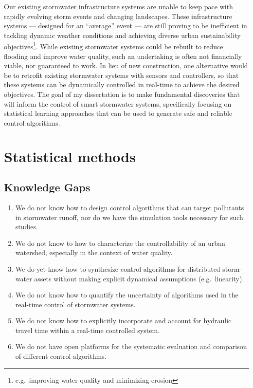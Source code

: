 Our existing stormwater infrastructure systems are unable to keep pace with rapidly evolving storm events and changing landscapes.
These infrastructure systems --- designed for an ``average'' event --- are still proving to be inefficient in tackling dynamic weather conditions and achieving diverse urban sustainability objectives\footnote{e.g.\ improving water quality and minimizing erosion}.
While existing stormwater systems could be rebuilt to reduce flooding and improve water quality, such an undertaking is often not financially viable, nor guaranteed to work.
In lieu of new construction, one alternative would be to retrofit  existing stormwater systems with sensors and controllers, so that these systems can be dynamically controlled in real-time to achieve the desired objectives.
The goal of my dissertation is to make fundamental discoveries that will inform the control of smart stormwater systems, specifically focusing on statistical learning approaches that can be used to generate safe and reliable control algorithms.

\section{Statistical methods}

\subsection*{Knowledge Gaps}
\begin{enumerate}
	\item We do not know how to design control algorithms that can target pollutants in stormwater runoff, nor do we have the simulation tools necessary for such studies.
	\item We do not know to how to characterize the controllability of an urban watershed, especially in the context of water quality.
	\item We do yet know how to synthesize control algorithms for distributed storm-water assets without making explicit dynamical assumptions (e.g.\ linearity).
	\item We do not know how to quantify the uncertainty of algorithms used in the real-time control of stormwater systems.
	\item We do not know how to explicitly incorporate and account for hydraulic travel time within a real-time controlled system.
	\item We do not have open platforms for the systematic evaluation and comparison of different control algorithms.
\end{enumerate}


